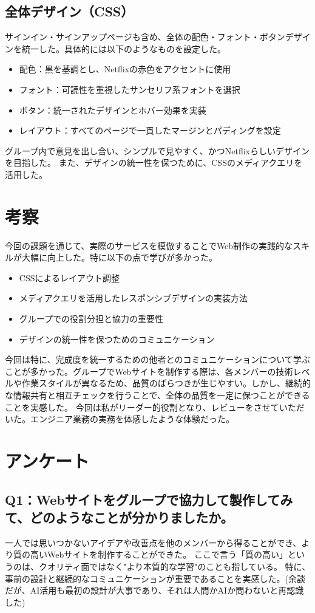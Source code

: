 \documentclass[12pt,a4j]{jarticle}
\begin{document}
\subsection{全体デザイン（CSS）}
サインイン・サインアップページも含め、全体の配色・フォント・ボタンデザインを統一した。具体的には以下のようなものを設定した。
\begin{itemize}
\item 配色：黒を基調とし、Netflixの赤色をアクセントに使用
\item フォント：可読性を重視したサンセリフ系フォントを選択
\item ボタン：統一されたデザインとホバー効果を実装
\item レイアウト：すべてのページで一貫したマージンとパディングを設定
\end{itemize}

グループ内で意見を出し合い、シンプルで見やすく、かつNetflixらしいデザインを目指した。
また、デザインの統一性を保つために、CSSのメディアクエリを活用した。

\section{考察}
今回の課題を通じて、実際のサービスを模倣することでWeb制作の実践的なスキルが大幅に向上した。特に以下の点で学びが多かった。

\begin{itemize}
\item CSSによるレイアウト調整
\item メディアクエリを活用したレスポンシブデザインの実装方法
\item グループでの役割分担と協力の重要性
\item デザインの統一性を保つためのコミュニケーション
\end{itemize}

今回は特に、完成度を統一するための他者とのコミュニケーションについて学ぶことが多かった。グループでWebサイトを制作する際は、各メンバーの技術レベルや作業スタイルが異なるため、品質のばらつきが生じやすい。しかし、継続的な情報共有と相互チェックを行うことで、全体の品質を一定に保つことができることを実感した。
今回は私がリーダー的役割となり、レビューをさせていただいた。エンジニア業務の実務を体感したような体験だった。

\section{アンケート}

\subsection{Q1：Webサイトをグループで協力して製作してみて、どのようなことが分かりましたか。}
一人では思いつかないアイデアや改善点を他のメンバーから得ることができ、より質の高いWebサイトを制作することができた。
ここで言う「質の高い」というのは、クオリティ面ではなく"より本質的な学習"のことも指している。
特に、事前の設計と継続的なコミュニケーションが重要であることを実感した。(余談だが、AI活用も最初の設計が大事であり、それは人間かAIか問わないと再認識した)
\end{document}
